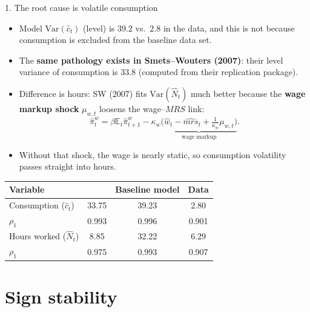 \documentclass[10pt]{beamer}
\begin{document}
\begin{frame}{1. The root cause is volatile consumption}
	\begin{itemize}
		\item Model $\mathrm{Var}(\hat c_t)$ (level) is $39.2$ vs.\ $2.8$ in the data, and this is not because consumption is excluded from the baseline data set.
		\item The \textbf{same pathology exists in Smets--Wouters (2007)}: their level variance of consumption is $33.8$ (computed from their replication package).
		\item Difference is hours: SW (2007) fits $\mathrm{Var}(\hat N_t)$ much better because the \textbf{wage markup shock} $\mu_{w,t}$ loosens the wage--$MRS$ link:
		\[
			\hat{\pi}_t^w = \beta \mathbb{E}_t \hat{\pi}_{t+1}^w - \kappa_w \underbrace{\Big(\hat{w}_t - \hat{mrs}_t + \tfrac{1}{\kappa_w}\mu_{w,t}\Big)}_{\text{wage markup}}.
		\]
		\item Without that shock, the wage is nearly static, so consumption volatility passes straight into hours.
	\end{itemize}

	\vspace{0.2em}
	\centering
	{\footnotesize
	\begin{tabular}{lccc}
		\hline\hline
		Variable & \cite{smetsShocksFrictionsUS2007} & Baseline model & Data \\
		\hline
		Consumption ($\hat{c}_t$) & 33.75 & 39.23 & 2.80 \\
		\quad $\rho_1$    & 0.993 & 0.996 & 0.901 \\
		Hours worked ($\hat{N}_t$)& 8.85  & 32.22 & 6.29 \\
		\quad $\rho_1$    & 0.975 & 0.993 & 0.907 \\
		\hline
	\end{tabular}}
\end{frame}

\section{Sign stability}
\end{document}
